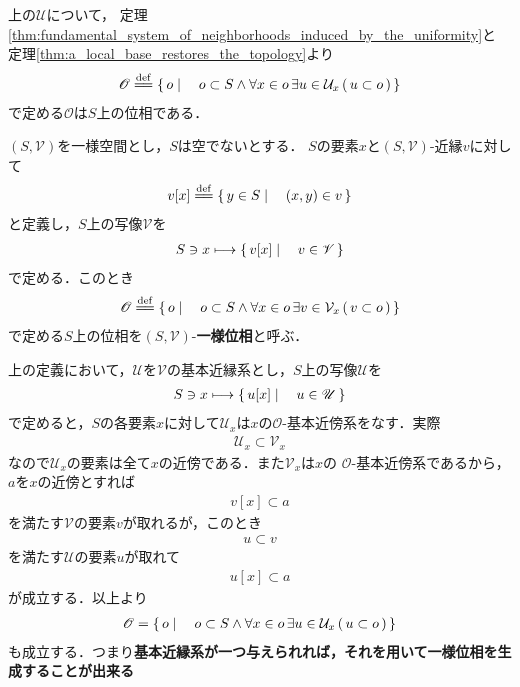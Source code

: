	上の$\mathcal{U}$について，
	定理\ref{thm:fundamental_system_of_neighborhoods_induced_by_the_uniformity}と
	定理\ref{thm:a_local_base_restores_the_topology}より
	\begin{align}
		\mathscr{O} \defeq 
		\Set{o}{o \subset S \wedge \forall x \in o\, \exists u \in \mathcal{U}_{x}\, (\, u \subset o\, )}
	\end{align}
	で定める$\mathscr{O}$は$S$上の位相である．
	
	\begin{screen}
		\begin{dfn}[一様位相]
			$(S,\mathscr{V})$を一様空間とし，$S$は空でないとする．
			$S$の要素$x$と$(S,\mathscr{V})$-近縁$v$に対して
			\begin{align}
				v[x] \defeq \Set{y \in S}{(x,y) \in v}
			\end{align}
			と定義し，$S$上の写像$\mathcal{V}$を
			\begin{align}
				S \ni x \longmapsto \left\{\, v[x] \mid \quad v \in \mathscr{V}\, \right\}
			\end{align}
			で定める．このとき
			\begin{align}
				\mathscr{O} \defeq 
				\Set{o}{o \subset S \wedge \forall x \in o\, \exists v \in \mathcal{V}_{x}\, (\, v \subset o\, )}
			\end{align}
			で定める$S$上の位相を$(S,\mathscr{V})$-{\bf 一様位相}と呼ぶ．
		\end{dfn}
	\end{screen}
	
	上の定義において，$\mathscr{U}$を$\mathscr{V}$の基本近縁系とし，$S$上の写像$\mathcal{U}$を
	\begin{align}
		S \ni x \longmapsto \left\{\, u[x] \mid \quad u \in \mathscr{U}\, \right\}
	\end{align}
	で定めると，$S$の各要素$x$に対して$\mathcal{U}_{x}$は$x$の$\mathscr{O}$-基本近傍系をなす．実際
	\begin{align}
		\mathcal{U}_{x} \subset \mathcal{V}_{x}
	\end{align}
	なので$\mathcal{U}_{x}$の要素は全て$x$の近傍である．また$\mathscr{V}_{x}$は$x$の
	$\mathscr{O}$-基本近傍系であるから，$a$を$x$の近傍とすれば
	\begin{align}
		v[x] \subset a
	\end{align}
	を満たす$\mathscr{V}$の要素$v$が取れるが，このとき
	\begin{align}
		u \subset v
	\end{align}
	を満たす$\mathscr{U}$の要素$u$が取れて
	\begin{align}
		u[x] \subset a
	\end{align}
	が成立する．以上より
	\begin{align}
		\mathscr{O}
		= \left\{\, o \mid \quad o \subset S \wedge \forall x \in o\, \exists u \in \mathcal{U}_{x}\, (\, u \subset o\, )\, \right\}
	\end{align}
	も成立する．つまり{\bf 基本近縁系が一つ与えられれば，それを用いて一様位相を生成することが出来る}
	
